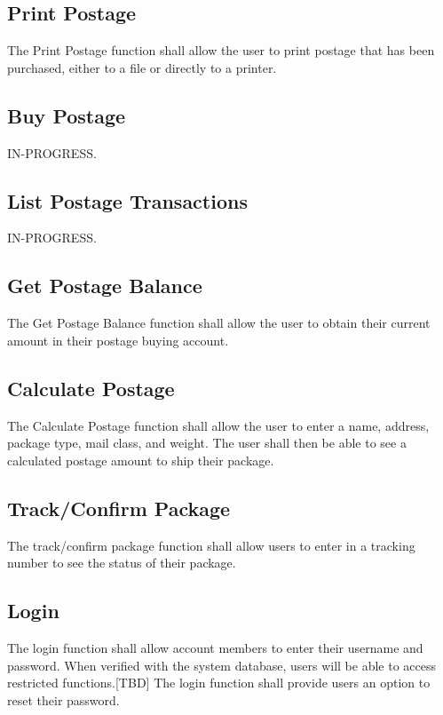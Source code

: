 \documentclass{scrreprt}
\begin{document}
\subsection{Print Postage}

The Print Postage function shall allow the user to print postage that has been 
purchased, either to a file or directly to a printer.

\subsection{Buy Postage}

IN-PROGRESS.

\subsection{List Postage Transactions}

IN-PROGRESS.

\subsection{Get Postage Balance}

The Get Postage Balance function shall allow the user to obtain their current
amount in their postage buying account.

\subsection{Calculate Postage}

The Calculate Postage function shall allow the user to enter a name, address,
package type, mail class, and weight. The user shall then be able to see a
calculated postage amount to ship their package.

\subsection{Track/Confirm Package}

The track/confirm package function shall allow users to enter in a tracking
number to see the status of their package.

\subsection{Login}

The login function shall allow account members to enter their username and
password.  When verified with the system database, users will be able to access
restricted functions.[TBD] The login function shall provide users an option to
reset their password. 
\end{document}
